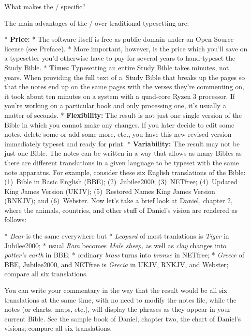 \sec What makes the \OpBible/ specific?

The main advantages of the \OpBible/ over traditional typesetting are:

\begitems
* {\bf Price:} \begitems
  * The software itself is free as public domain under an Open Source license (see Preface). 
  * More important, however, is the price which   you'll save on a typesetter you'd otherwise have 
  to pay for several years to hand-typeset the Study Bible.
        \enditems
* {\bf Time:} Typesetting an entire Study Bible takes minutes, not years. 
 When providing the full text of a~Study Bible  that breaks up the pages 
 so that the notes end up on the same pages with the verses they're commenting on, 
 it took about   ten minutes on a system with a quad-core Ryzen 3 processor. 
 If you're working on a particular book and only processing one, 
 it's usually a matter of seconds.
* {\bf Flexibility:} The result is not just one single version of the Bible in which you cannot 
 make  any changes. If you later decide to edit some notes, delete some or add some more, etc.,
  you have this new revised version immediately typeset and ready for print.
* {\bf Variability:} The result may not be
  just one Bible. The notes can be written in a way that allows as many Bibles as there are 
  different translations in a given language to be typeset with the same note apparatus. 
  For example, consider these six English translations of the Bible: 
(1)~Bible in Basic English (BBE); (2)~Jubilee2000; (3)~NETfree; (4)~Updated King James Version (UKJV); (5)~Restored Names King James Version (RNKJV); and (6)~Webster.
Now let's take a brief look at Daniel, chapter 2, where the animals, countries, and other stuff of Daniel's vision are rendered as follows: 

\begitems
* {\it Bear\/} is the same everywhere but
* {\it Leopard\/} of most tranlations is {\it Tiger\/} in Jubilee2000;
* usual {\it Ram\/} becomes {\it Male sheep,\/} as well as {\it clay\/} changes into {\it potter's earth\/} in BBE;
* ordinary {\it brass\/} turns into {\it bronze\/} in NETfree;
* {\it Greece\/} of BBE, Jubilee2000, and NETfree is {\it Grecia\/} in UKJV, RNKJV, and Webster; compare all six translations.
\enditems

You can write your commentary in the way that the result would be all six translations at the same time, with no need to modify the notes file, while the notes (or charts, maps, etc.), will display the phrases as they appear in your current Bible. See the sample book of Daniel, chapter two, the chart of Daniel's visions; compare all six translations.

